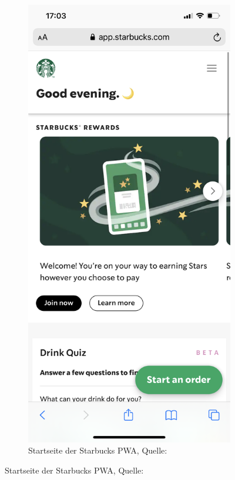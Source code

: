 \begin{figure}[h]
	\begin{subfigure}[b]{0.4\textwidth}
		\includegraphics[scale=0.15]{images/starbucks_main.PNG}
		\caption[Startseite der Starbucks \gls{PWA}]{Startseite der Starbucks \gls{PWA}, Quelle: \cite{starbucksPwaMain}}

\end{subfigure}
\end{figure}
